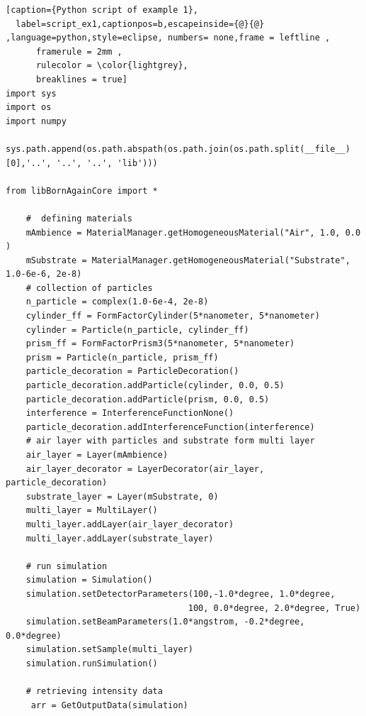 \newpage
\begin{lstlisting}[caption={Python script of example 1},
  label=script_ex1,captionpos=b,escapeinside={@}{@} ,language=python,style=eclipse, numbers= none,frame = leftline ,
      framerule = 2mm ,
      rulecolor = \color{lightgrey},
      breaklines = true]
import sys
import os
import numpy 

sys.path.append(os.path.abspath(os.path.join(os.path.split(__file__)[0],'..', '..', '..', 'lib')))

from libBornAgainCore import * 

    #  defining materials 
    mAmbience = MaterialManager.getHomogeneousMaterial("Air", 1.0, 0.0 ) 
    mSubstrate = MaterialManager.getHomogeneousMaterial("Substrate", 1.0-6e-6, 2e-8) 
    # collection of particles 
    n_particle = complex(1.0-6e-4, 2e-8) 
    cylinder_ff = FormFactorCylinder(5*nanometer, 5*nanometer) 
    cylinder = Particle(n_particle, cylinder_ff) 
    prism_ff = FormFactorPrism3(5*nanometer, 5*nanometer) 
    prism = Particle(n_particle, prism_ff) 
    particle_decoration = ParticleDecoration()  
    particle_decoration.addParticle(cylinder, 0.0, 0.5)  
    particle_decoration.addParticle(prism, 0.0, 0.5)  
    interference = InterferenceFunctionNone()  
    particle_decoration.addInterferenceFunction(interference)  
    # air layer with particles and substrate form multi layer 
    air_layer = Layer(mAmbience)  
    air_layer_decorator = LayerDecorator(air_layer, particle_decoration) 
    substrate_layer = Layer(mSubstrate, 0) 
    multi_layer = MultiLayer()  
    multi_layer.addLayer(air_layer_decorator) 
    multi_layer.addLayer(substrate_layer) 

    # run simulation  
    simulation = Simulation()  
    simulation.setDetectorParameters(100,-1.0*degree, 1.0*degree, 
                                    100, 0.0*degree, 2.0*degree, True) 
    simulation.setBeamParameters(1.0*angstrom, -0.2*degree, 0.0*degree) 
    simulation.setSample(multi_layer) 
    simulation.runSimulation()  

    # retrieving intensity data
     arr = GetOutputData(simulation)
\end{lstlisting}




